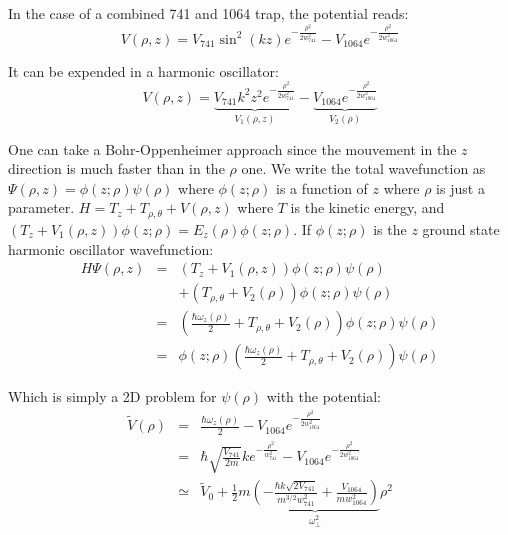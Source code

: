 \documentclass[reprint,amsmath,amssymb,aps,nofootinbib]{revtex4-1}
\begin{document}
In the case of a combined 741 and 1064 trap, the potential reads:
\begin{equation}
V(\rho, z) = V_{741}\sin^{2}(kz)e^{-\frac{\rho^{2}}{2w_{741}^{2}}}-V_{1064}e^{-\frac{\rho^{2}}{2w_{1064}^{2}}}
\end{equation}

It can be expended in a harmonic oscillator:
\begin{equation}
V(\rho, z) = \underbrace{V_{741}k^{2}z^{2}e^{-\frac{\rho^{2}}{2w_{741}^{2}}}}_{V_{1}(\rho, z)}-\underbrace{V_{1064}e^{-\frac{\rho^{2}}{2w_{1064}^{2}}}}_{V_{2}(\rho)}
\end{equation}

One can take a Bohr-Oppenheimer approach since the mouvement in the $z$ direction is much faster than in the $\rho$ one. We write the total wavefunction as $\Psi(\rho, z) = \phi(z;\rho)\psi(\rho)$ where $\phi(z;\rho)$ is a function of $z$ where $\rho$ is just a parameter. $H = T_{z} + T_{\rho, \theta} + V(\rho, z)$ where $T$ is the kinetic energy, and $(T_{z} + V_{1}(\rho,z))\phi(z;\rho) = E_{z}(\rho)\phi(z;\rho)$. If $\phi(z;\rho)$ is the $z$ ground state harmonic oscillator wavefunction:
\begin{equation}
\begin{array}{llll}
H\Psi(\rho, z) &=& (T_{z}+V_{1}(\rho,z))\phi(z;\rho)\psi(\rho) \\
& &+(T_{\rho, \theta} + V_{2}(\rho))\phi(z;\rho)\psi(\rho)\\
&=& (\frac{\hbar\omega_{z}(\rho)}{2}+T_{\rho, \theta} + V_{2}(\rho))\phi(z;\rho)\psi(\rho) \\
&=& \phi(z;\rho)(\frac{\hbar\omega_{z}(\rho)}{2}+T_{\rho, \theta} + V_{2}(\rho))\psi(\rho)
\end{array}
\end{equation}

Which is simply a 2D problem for $\psi(\rho)$ with the potential:
\begin{equation}
\begin{array}{lll}
\tilde{V}(\rho) &=& \frac{\hbar\omega_{z}(\rho)}{2} - V_{1064}e^{-\frac{\rho^{2}}{2w_{1064}^{2}}}\\
		     &=&  \hbar\sqrt{\frac{V_{741}}{2m}}ke^{-\frac{\rho^{2}}{w_{741}^{2}}} - V_{1064}e^{-\frac{\rho^{2}}{2w_{1064}^{2}}}\\
		     &\simeq& \tilde{V}_{0}+\frac{1}{2}m\underbrace{\left(-\frac{\hbar k\sqrt{2V_{741}}}{m^{3/2}w_{741}^{2}}+\frac{V_{1064}}{mw_{1064}^{2}}\right)}_{\omega_{\perp}^{2}}\rho^{2}
\end{array}
\end{equation}
\end{document}
